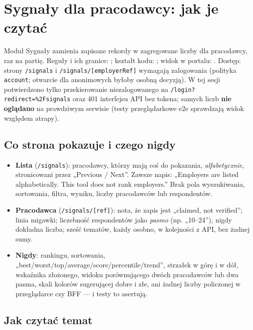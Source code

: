 {\section{Sygnały dla pracodawcy: jak je czytać}
\label{sec:sygnaly}

Moduł Sygnały zamienia zapisane rekordy w zagregowane liczby dla pracodawcy, raz
na partię. Reguły i ich granice: ; kształt
kodu: ; widok w portalu:
. Dostęp: strony \texttt{/signals} i
\texttt{/\allowbreak{}signals/\allowbreak{}[employerRef]} wymagają zalogowania (polityka \texttt{account};
otwarcie dla anonimowych byłoby osobną decyzją). W tej sesji potwierdzono tylko
przekierowanie niezalogowanego na \texttt{/\allowbreak{}login?redirect=\%2Fsignals} oraz 401
interfejsu API bez tokena; samych liczb \textbf{nie oglądano} na prawdziwym
serwisie (testy przeglądarkowe e2e sprawdzają widok względem atrapy).

\subsection{Co strona pokazuje i czego nigdy}

\begin{itemize}[leftmargin=*,itemsep=2pt]
  \item \textbf{Lista} (\texttt{/signals}): pracodawcy, którzy mają coś do
        pokazania, \emph{alfabetycznie}, stronicowani przez „Previous / Next”.
        Zawsze napis: „Employers are listed alphabetically. This tool does not
        rank employers.” Brak pola wyszukiwania, sortowania, filtra, wyniku,
        liczby pracodawców lub respondentów.
  \item \textbf{Pracodawca} (\texttt{/signals/[ref]}): nota, że zapis jest
        „claimed, not verified”; linia migawki; liczebność respondentów jako
        \emph{pasmo} (np. „10--24”), nigdy dokładna liczba; sześć tematów, każdy
        osobno, w kolejności z API, bez żadnej sumy.
  \item \textbf{Nigdy}: rankingu, sortowania, „best/worst/top/average/score/percentile/trend”,
        strzałek w górę i w dół, wskaźnika złożonego, widoku porównującego dwóch
        pracodawców lub dwa pasma, skali kolorów sugerującej dobre i złe, ani żadnej
        liczby policzonej w przeglądarce czy BFF --- i testy to asertują.
\end{itemize}

\subsection{Jak czytać temat}

}
